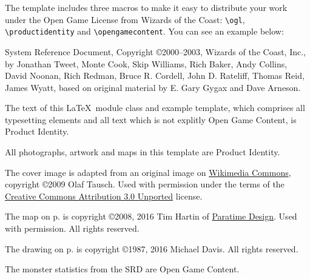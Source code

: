 \documentclass[letterpaper,serif]{module}
\begin{document}
The template includes three macros to make it easy to distribute your work under the Open Game License
from Wizards of the Coast: \verb|\ogl|, \verb|\productidentity| and \verb|\opengamecontent|. You can see
an example below:

\begin{ogl}
\item System Reference Document, Copyright \copyright 2000--2003, Wizards of the Coast, Inc., by Jonathan Tweet, Monte Cook,
Skip Williams, Rich Baker, Andy Collins, David Noonan, Rich Redman, Bruce R. Cordell, John D. Rateliff, Thomas Reid, James
Wyatt, based on original material by E. Gary Gygax and Dave Arneson.
\end{ogl}

\begin{productidentity}
\item The text of this \LaTeX~module class and example template, which comprises all typesetting elements and all text which
is not explitly Open Game Content, is Product Identity.
\modulecopyright

\item All photographs, artwork and maps in this template are Product Identity.

\item The cover image is adapted from an original image on
\href{https://commons.wikimedia.org/wiki/File:Karnak_Tempel_Vorhof_05.jpg}{Wikimedia Commons}, copyright \copyright 2009 Olaf
Tausch. Used with permission under the terms of the
\href{https://creativecommons.org/licenses/by/3.0/deed.en}{Creative Commons Attribution 3.0 Unported} license.

\item The map on p.\pageref{img:map} is copyright \copyright 2008, 2016 Tim Hartin of \href{http://paratime.ca}{Paratime Design}.
Used with permission. All rights reserved.

\item The drawing on p.\pageref{img:tomb} is copyright \copyright 1987, 2016 Michael Davis. All rights reserved.
\end{productidentity}

\begin{opengamecontent}
\item The monster statistics from the SRD are Open Game Content.
\end{opengamecontent}

%
%

\tableofcontents

\end{document}
